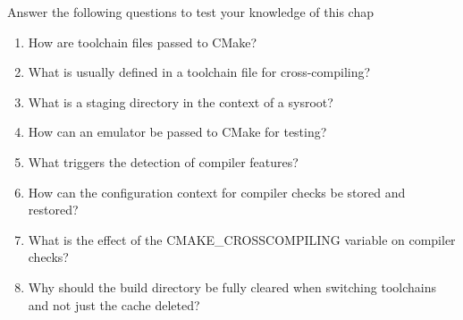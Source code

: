 Answer the following questions to test your knowledge of this chap

\begin{enumerate}
\item 
How are toolchain files passed to CMake?

\item 
What is usually defined in a toolchain file for cross-compiling?

\item 
What is a staging directory in the context of a sysroot?

\item 
How can an emulator be passed to CMake for testing?

\item 
What triggers the detection of compiler features?

\item 
How can the configuration context for compiler checks be stored and restored?

\item 
What is the effect of the CMAKE\_CROSSCOMPILING variable on compiler checks?

\item 
Why should the build directory be fully cleared when switching toolchains and not just the cache deleted?
\end{enumerate}